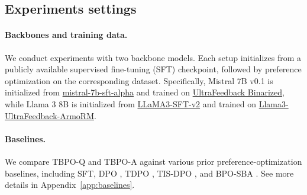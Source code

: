 \documentclass{article}
\theoremstyle{plain}
\theoremstyle{definition}
\theoremstyle{remark}
\begin{document}
\subsection{Experiments settings}

\paragraph{Backbones and training data.}
We conduct experiments with two backbone models. Each setup initializes from a publicly available supervised fine-tuning (SFT) checkpoint, followed by preference optimization on the corresponding dataset. Specifically, Mistral 7B v0.1 is initialized from \href{https://huggingface.co/HuggingFaceH4/mistral-7b-sft-alpha}{mistral-7b-sft-alpha} and trained on \href{https://huggingface.co/datasets/HuggingFaceH4/ultrafeedback_binarized}{UltraFeedback Binarized}, while Llama 3 8B is initialized from \href{https://huggingface.co/RLHFlow/LLaMA3-SFT-v2}{LLaMA3-SFT-v2} and trained on \href{https://huggingface.co/datasets/princeton-nlp/llama3-ultrafeedback-armorm}{Llama3-UltraFeedback-ArmoRM}.

\paragraph{Baselines.}
We compare TBPO-Q and TBPO-A against various prior preference-optimization baselines, including SFT, DPO \cite{rafailov2023dpo}, TDPO \cite{zeng2024tokenleveldirectpreferenceoptimization}, TIS-DPO \cite{tis-dpo}, and BPO-SBA \cite{kim2025preferenceoptimizationestimatingratio}. See more details in Appendix~\ref{app:baselines}.

\end{document}

